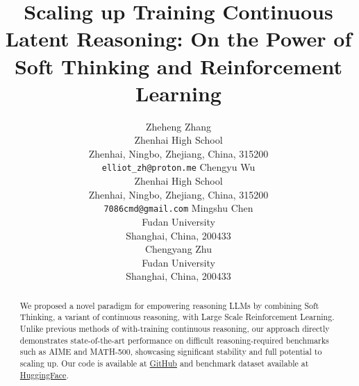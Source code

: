 \documentclass{article} %
\title{Scaling up Training Continuous Latent Reasoning: On the Power of Soft Thinking and Reinforcement Learning}
\author{%
    Zheheng Zhang \\
    Zhenhai High School \\
    Zhenhai, Ningbo, Zhejiang, China, 315200 \\
    \texttt{elliot\_zh@proton.me}
    \And
    Chengyu Wu \\
    Zhenhai High School \\
    Zhenhai, Ningbo, Zhejiang, China, 315200 \\
    \texttt{7086cmd@gmail.com}
    \AND
    Mingshu Chen \\
    Fudan University \\
    Shanghai, China, 200433 \\
    \And
    Chengyang Zhu \\
    Fudan University \\
    Shanghai, China, 200433
}
\begin{document}
    \maketitle
    \begin{abstract}
        We proposed a novel paradigm for empowering reasoning LLMs by combining Soft Thinking, a variant of continuous reasoning, with Large Scale Reinforcement Learning. Unlike previous methods of with-training continuous reasoning, our approach directly demonstrates state-of-the-art performance on difficult reasoning-required benchmarks such as AIME and MATH-500, showcasing significant stability and full potential to scaling up.
        Our code is available at \href{https://github.com/elliot-zzh/from-transparent-to-opaque}{GitHub} and benchmark dataset available at \href{https://huggingface.co/datasets/ethangoh7086cmd/st-train-all}{HuggingFace}.
    \end{abstract}
\end{document}
